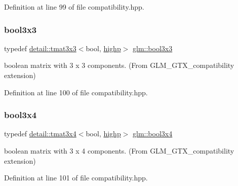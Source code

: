 Definition at line 99 of file compatibility.\+hpp.

\mbox{\label{group__gtx__compatibility_gae9cc5d3d9c72543e303af4d702bf7b40}} 
\subsubsection{\texorpdfstring{bool3x3}{bool3x3}}
{\footnotesize\ttfamily typedef \hyperlink{structglm_1_1detail_1_1tmat3x3}{detail\+::tmat3x3}$<$bool, \hyperlink{namespaceglm_a0f04f086094c747d227af4425893f545ac6f7eab42eacbb10d59a58e95e362074}{highp}$>$ \hyperlink{group__gtx__compatibility_gae9cc5d3d9c72543e303af4d702bf7b40}{glm\+::bool3x3}}



boolean matrix with 3 x 3 components. (From G\+L\+M\+\_\+\+G\+T\+X\+\_\+compatibility extension) 



Definition at line 100 of file compatibility.\+hpp.

\mbox{\label{group__gtx__compatibility_gaf68d62e1c790fa3f09ef5e866af690f1}} 
\subsubsection{\texorpdfstring{bool3x4}{bool3x4}}
{\footnotesize\ttfamily typedef \hyperlink{structglm_1_1detail_1_1tmat3x4}{detail\+::tmat3x4}$<$bool, \hyperlink{namespaceglm_a0f04f086094c747d227af4425893f545ac6f7eab42eacbb10d59a58e95e362074}{highp}$>$ \hyperlink{group__gtx__compatibility_gaf68d62e1c790fa3f09ef5e866af690f1}{glm\+::bool3x4}}



boolean matrix with 3 x 4 components. (From G\+L\+M\+\_\+\+G\+T\+X\+\_\+compatibility extension) 



Definition at line 101 of file compatibility.\+hpp.

\mbox{\label{group__gtx__compatibility_ga6ef1f104d22f384c4d59f2b1ca1768a7}} 
